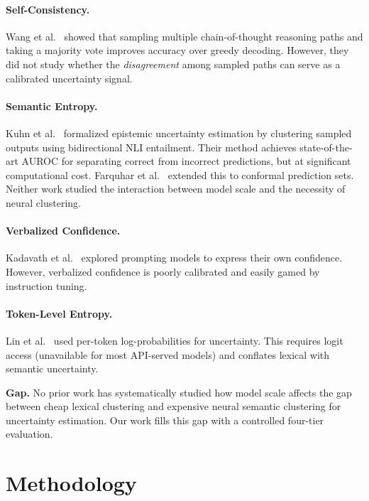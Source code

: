 \documentclass[11pt]{article}
\begin{document}
\paragraph{Self-Consistency.} Wang et al.~\cite{wang2022self} showed that sampling multiple chain-of-thought reasoning paths and taking a majority vote improves accuracy over greedy decoding. However, they did not study whether the \textit{disagreement} among sampled paths can serve as a calibrated uncertainty signal.

\paragraph{Semantic Entropy.} Kuhn et al.~\cite{kuhn2023semantic} formalized epistemic uncertainty estimation by clustering sampled outputs using bidirectional NLI entailment. Their method achieves state-of-the-art AUROC for separating correct from incorrect predictions, but at significant computational cost. Farquhar et al.~\cite{farquhar2024detecting} extended this to conformal prediction sets. Neither work studied the interaction between model scale and the necessity of neural clustering.

\paragraph{Verbalized Confidence.} Kadavath et al.~\cite{kadavath2022language} explored prompting models to express their own confidence. However, verbalized confidence is poorly calibrated and easily gamed by instruction tuning.

\paragraph{Token-Level Entropy.} Lin et al.~\cite{lin2023generating} used per-token log-probabilities for uncertainty. This requires logit access (unavailable for most API-served models) and conflates lexical with semantic uncertainty.

\textbf{Gap.} No prior work has systematically studied how model scale affects the gap between cheap lexical clustering and expensive neural semantic clustering for uncertainty estimation. Our work fills this gap with a controlled four-tier evaluation.

\section{Methodology}
\end{document}

